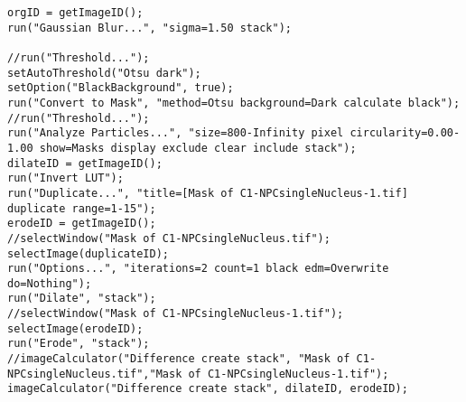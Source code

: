 \begin{lstlisting}[morekeywords={*, getImageID, selectImage, orgID, dilateID, erodeID}]
orgID = getImageID();
run("Gaussian Blur...", "sigma=1.50 stack");

//run("Threshold...");
setAutoThreshold("Otsu dark");
setOption("BlackBackground", true);
run("Convert to Mask", "method=Otsu background=Dark calculate black");
//run("Threshold...");
run("Analyze Particles...", "size=800-Infinity pixel circularity=0.00-1.00 show=Masks display exclude clear include stack");
dilateID = getImageID();
run("Invert LUT");
run("Duplicate...", "title=[Mask of C1-NPCsingleNucleus-1.tif] duplicate range=1-15");
erodeID = getImageID();
//selectWindow("Mask of C1-NPCsingleNucleus.tif");
selectImage(duplicateID);
run("Options...", "iterations=2 count=1 black edm=Overwrite do=Nothing");
run("Dilate", "stack");
//selectWindow("Mask of C1-NPCsingleNucleus-1.tif");
selectImage(erodeID);
run("Erode", "stack");
//imageCalculator("Difference create stack", "Mask of C1-NPCsingleNucleus.tif","Mask of C1-NPCsingleNucleus-1.tif");
imageCalculator("Difference create stack", dilateID, erodeID);


\end{lstlisting}